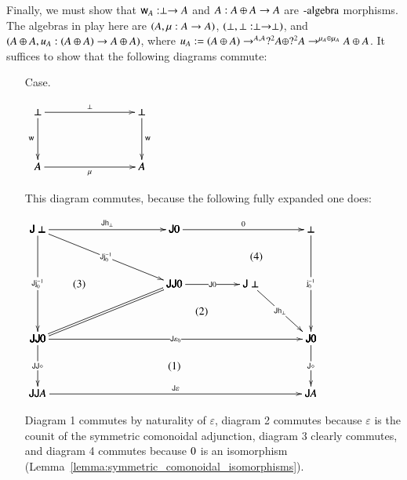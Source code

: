 \documentclass{lmcs}
\let\mto\to
\let\to\relax
\newcommand{\to}{\rightarrow}
\let\r\relax
\let\c\relax
\let\j\relax
\let\wn\relax
\let\H\relax
\newcommand{\func}[1]{\mathsf{#1}}
\newcommand{\H}[0]{\func{H}}
\newcommand{\J}[0]{\func{J}}
\newcommand{\h}[1]{\mathsf{h}_{#1}}
\newcommand{\r}[1]{\mathsf{r}_{#1}}
\newcommand{\w}[1]{\mathsf{w}_{#1}}
\newcommand{\c}[1]{\mathsf{c}_{#1}}
\newcommand{\j}[1]{\mathsf{j}_{#1}}
\newcommand{\jinv}[1]{\mathsf{j}^{-1}_{#1}}
\newcommand{\wn}[0]{\mathop{?}}
\newenvironment{diagram}{
  \begin{center}
    \begin{math}
      \bfig
}{
      \efig
    \end{math}
  \end{center}
}
\begin{document}
Finally, we must show that $\w{A} : \perp \mto \wn A$ and $\c{A} :
\wn A \oplus \wn A \mto \wn A$ are $\wn\text{-algebra}$ morphisms.
The algebras in play here are $(\wn A,\mu : \wn\wn A \mto \wn A)$,
$(\perp, \r{\perp} : \wn \perp \mto \perp)$, and $(\wn A \oplus \wn
A, u_A : \wn (\wn A \oplus \wn A) \mto \wn A \oplus \wn A)$, where
$u_A := \wn (\wn A \oplus \wn A) \mto^{\r{\wn A,\wn A}} ?^2 A \oplus
?^2 A \mto^{\mu_A \oplus \mu_A} \wn A \oplus \wn A$.  It suffices to
show that the following diagrams commute:
\begin{itemize}
\item[Case.]\ \\
  \begin{diagram}
    \square<950,500>[
      \wn \perp`
      \perp`
      \wn\wn A`
      \wn A;
      \r{\perp}`
      \wn\w{}`
      \w{}`
      \mu]
  \end{diagram}
  This diagram commutes, because the following fully expanded one does:
  \begin{diagram}
    \square|mmma|<2500,500>[
      \J\H\J 0`
      \J 0`
      \J\H\J\H A`
      \J\H A;
      \J\varepsilon_0`
      \J\H\J\diamond`
      \J\diamond`
      \J\varepsilon]

    \square(0,500)|amma|/->`->``/<1250,1000>[
      \J\H\perp`
      \J 0`
      \J\H\J 0`;
      \J\h{\perp}`
      \J\H\jinv{0}``]
    \square(1250,500)|amma|/->``->`/<1250,1000>[
      \J 0`
      \perp``
      \J 0;
      \j{0}``
      \jinv{0}`]

    \Dtriangle(0,500)|mmm|/`->`=/<1250,500>[
      \J\H \perp`
      \J\H\J 0`
      \J\H\J 0;`
      \J\H\jinv{0}`]

    \morphism(1250,1000)|m|<700,0>[
      \J\H\J 0`
      \J\H \perp;
      \J\H\j{0}]

    \morphism(1950,1000)|m|<550,-500>[
      \J\H \perp`
      \J 0;
      \J\h{\perp}]

    \place(1250,250)[(1)]
    \place(1500,750)[(2)]
    \place(380,1000)[(3)]
    \place(2000,1250)[(4)]
  \end{diagram}
  Diagram 1 commutes by naturality of $\varepsilon$, diagram 2
  commutes because $\varepsilon$ is the counit of the symmetric
  comonoidal adjunction, diagram 3 clearly commutes, and diagram 4
  commutes because $\j{0}$ is an isomorphism
  (Lemma~\ref{lemma:symmetric_comonoidal_isomorphisms}).
  

\end{itemize}
\end{document}
